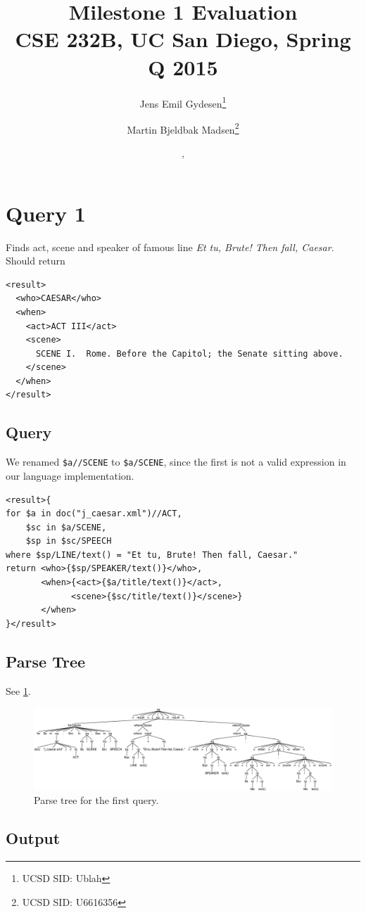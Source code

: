 \documentclass{article}
\title{Milestone 1 Evaluation\\
{\small CSE 232B, UC San Diego, Spring Q 2015}}
\author{Jens Emil Gydesen\thanks{UCSD SID: Ublah} \and
        Martin Bjeldbak Madsen\thanks{UCSD SID: U6616356}}
\date{\DTMdisplaydate{2015}{5}{13}{3}, \DTMdisplaytime{11}{10}{00}}
\begin{document}
\maketitle

\section{Query 1}
Finds act, scene and speaker of famous line \emph{Et tu, Brute! Then fall, Caesar}. Should return 

\begin{verbatim}
<result>
  <who>CAESAR</who>
  <when>
    <act>ACT III</act>
    <scene>
      SCENE I.  Rome. Before the Capitol; the Senate sitting above.
    </scene>
  </when>
</result>
\end{verbatim}

\subsection{Query}
We renamed \texttt{\$a//SCENE} to \texttt{\$a/SCENE}, since the first is not a  valid expression in our language implementation.
\begin{verbatim}
<result>{
for $a in doc("j_caesar.xml")//ACT,
    $sc in $a/SCENE,
    $sp in $sc/SPEECH
where $sp/LINE/text() = "Et tu, Brute! Then fall, Caesar."
return <who>{$sp/SPEAKER/text()}</who>,
       <when>{<act>{$a/title/text()}</act>,
             <scene>{$sc/title/text()}</scene>}
       </when>
}</result>
\end{verbatim}

\subsection{Parse Tree}
See \cref{fig:parseTree1}.
\begin{figure}[htpb]
  \centering
  \includegraphics[width=\linewidth]{imgs/antlr4_parse_tree_query_1.png}
  \caption{Parse tree for the first query.}\label{fig:parseTree1}
\end{figure}

\subsection{Output}
\end{document}
